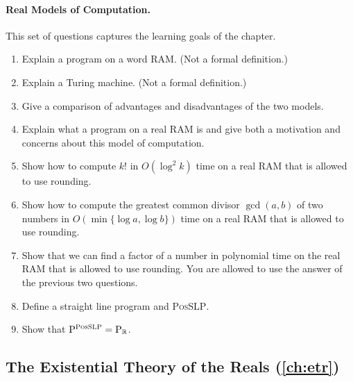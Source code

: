 \paragraph{Real Models of Computation.}
This set of questions captures the learning goals of the chapter.
\begin{enumerate}
  \item Explain a program on a word RAM. (Not a formal definition.)
  \item Explain a Turing machine. (Not a formal definition.)
  \item Give a comparison of advantages and disadvantages of the two models.
  \item Explain what a program on a real RAM is and give both a motivation and
        concerns about this model of computation.
  \item Show how to compute $k!$ in $O(\log^2 k)$ time on a real RAM that is
        allowed to use rounding.
  \item Show how to compute the greatest common divisor $\gcd(a,b)$ of two
        numbers in $O(\min\{\log a, \log b\})$ time on a real RAM that is
        allowed to use rounding.
  \item Show that we can find a factor of a number in polynomial time on the real
        RAM that is allowed to use rounding. You are allowed to use the answer of
        the previous two questions.
  \item Define a straight line program and \textsc{PosSLP}.
  \item Show that $\mathrm{P}^{\textsc{PosSLP}} = \mathrm{P}_{\mathbb{R}}$.
\end{enumerate}

\subsection*{The Existential Theory of the Reals (\cref{ch:etr})}

